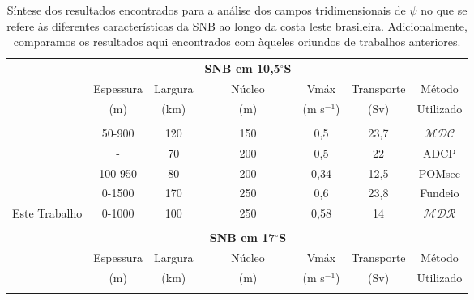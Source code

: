 \begin{table}
\caption{\label{tab:snb} \small Síntese dos resultados encontrados para a análise dos campos tridimensionais de 
$\psi$ no que se refere às diferentes características da SNB ao longo da costa leste brasileira. Adicionalmente, 
comparamos os resultados aqui encontrados com àqueles oriundos de trabalhos anteriores. }
\begin{center}
\begin{sideways}
\renewcommand{\baselinestretch}{2}
\begin{tabular}{|lcccccc|}
\hline 
 & & & {\bf SNB em 10,5$^\circ$S} & & & \\ 
 & Espessura & Largura  & Núcleo & Vmáx & Transporte & Método \vspace{-0.1cm} \\
 & (m) & (km) & (m) & (m s$^{-1}$) & (Sv) & Utilizado\\
\hline 
 & & & & & &\vspace{-0.4cm} \\
\cite{silveira_etal1994}  & 50-900 & 120 & 150 & 0,5 & 23,7 & $\mathcal{MDC}$ \vspace{0.1cm} \\ 
\cite{stramma_etal1995}  & - & 70 & 200 & 0,5 & 22 & ADCP \vspace{0.1cm} \\ 
\cite{soutelino2005}  & 100-950 & 80 & 200 & 0,34 & 12,5 & POMsec \vspace{0.1cm} \\ 
\cite{schott_etal2005}  & 0-1500 & 170 & 250 & 0,6 & 23,8 &  Fundeio \vspace{0.1cm} \\ 
Este Trabalho  & 0-1000 & 100 & 250 & 0,58 & 14 & $\mathcal{MDR}$ \vspace{0.1cm} \\ 
\hline
 & & & & & &\vspace{-0.4cm} \\
 & & & {\bf SNB em 17$^\circ$S} & & & \\  
& Espessura & Largura  & Núcleo & Vmáx & Transporte & Método \vspace{-0.1cm} \\
& (m) & (km) & (m) & (m s$^{-1}$) & (Sv) & Utilizado\\
\hline 
 & & & & & &\vspace{-0.4cm} \\

\end{tabular}
\end{sideways}
\end{center}
\end{table}
